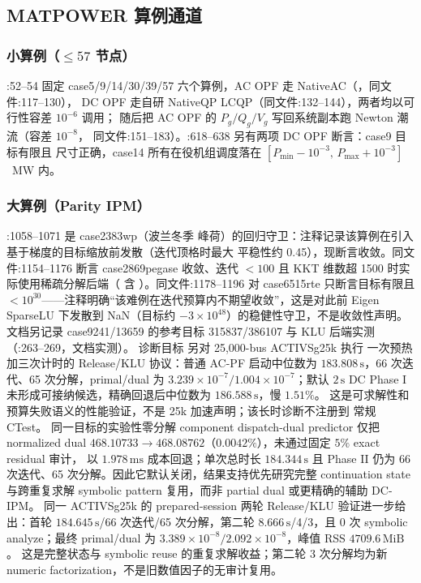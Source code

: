 \subsection{MATPOWER 算例通道}\label{subsec:ver:matpower}

\subsubsection*{小算例（$\le 57$ 节点）}
:52--54 固定 case5/9/14/30/39/57
六个算例，AC OPF 走 NativeAC（，同文件:117--130），
DC OPF 走自研 NativeQP LCQP（同文件:132--144），两者均以可行性容差 $10^{-6}$ 调用；
随后把 AC OPF 的 $P_g/Q_g/V_g$ 写回系统副本跑 Newton 潮流（容差 $10^{-8}$，
同文件:151--183）。:618--638 另有两项
DC OPF 断言：case9 目标有限且  尺寸正确，case14 所有在役机组调度落在
$[P_{\min}-10^{-3},\,P_{\max}+10^{-3}]$~MW 内。

\subsubsection*{大算例（Parity IPM）}
:1058--1071 是 case2383wp（波兰冬季
峰荷）的回归守卫：注释记录该算例在引入基于梯度的目标缩放前发散（迭代顶格时最大
平稳性约 0.45），现断言收敛。同文件:1154--1176 断言 case2869pegase 收敛、迭代
$<100$ 且 KKT 维数超 1500 时实际使用稀疏分解后端（
含 ）。同文件:1178--1196 对 case6515rte 只断言目标有限且
$<10^{30}$——注释明确“该难例在迭代预算内不期望收敛”，这是对此前 Eigen SparseLU
下发散到 NaN（目标约 $-3\times10^{48}$）的稳健性守卫，不是收敛性声明。
文档另记录 case9241/13659 的参考目标 315837/386107 与 KLU 后端实测
（:263--269，文档实测）。
诊断目标  另对 25,000-bus ACTIVSg25k 执行
一次预热加三次计时的 Release/KLU 协议：普通 AC-PF 启动中位数为
$183.808\,\mathrm{s}$，66 次迭代、65 次分解，primal/dual 为
$3.239\times10^{-7}/1.004\times10^{-7}$；默认 $2\,\mathrm{s}$ DC Phase I
未形成可接纳候选，精确回退后中位数为 $186.588\,\mathrm{s}$，慢 $1.51\%$。
这是可求解性和预算失败语义的性能验证，不是 25k 加速声明；该长时诊断不注册到
常规 CTest。
同一目标的实验性零分解 component dispatch-dual predictor 仅把 normalized dual
$468.10733\to468.08762$（$0.0042\%$），未通过固定 $5\%$ exact residual 审计，
以 $1.978\,\mathrm{ms}$ 成本回退；单次总时长 $184.344\,\mathrm{s}$ 且 Phase II
仍为 66 次迭代、65 次分解。因此它默认关闭，结果支持优先研究完整 continuation
state 与跨重复求解 symbolic pattern 复用，而非 partial dual 或更精确的辅助 DC-IPM。
同一 ACTIVSg25k 的 prepared-session 两轮 Release/KLU 验证进一步给出：首轮
$184.645\,\mathrm{s}$/66 次迭代/65 次分解，第二轮
$8.666\,\mathrm{s}$/4/3，且 0 次 symbolic analyze；最终 primal/dual 为
$3.389\times10^{-8}/2.092\times10^{-8}$，峰值 RSS $4709.6\,\mathrm{MiB}$。
这是完整状态与 symbolic reuse 的重复求解收益；第二轮 3 次分解均为新 numeric
factorization，不是旧数值因子的无审计复用。

